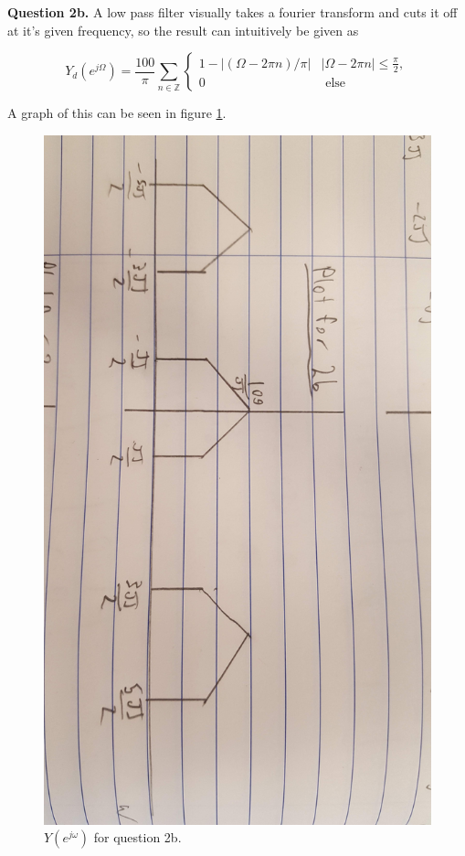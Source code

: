 \documentclass[letterpaper, reqno,11pt]{article}
\newcommand{\ZZ}{\mathbb{Z}}
\begin{document}
{\noindent\bf Question 2b.} A low pass filter visually takes a fourier transform and cuts it off at it's given frequency, so the result can intuitively be given as 

\[
    Y_d(e^{j\Omega})=\frac{100}\pi\sum_{n\in\ZZ}\begin{cases}1-|(\Omega-2\pi n)/\pi|&|\Omega-2\pi n|\leq \frac\pi2,\\0&\text{ else}\end{cases}
\]

A graph of this can be seen in figure \ref{fig:2b}. 

\begin{figure}[htbp]
\centering
\includegraphics[width=\textwidth]{2b}
\caption{$Y(e^{j\omega})$ for question 2b. }
\label{fig:2b}
\end{figure}
\end{document}
